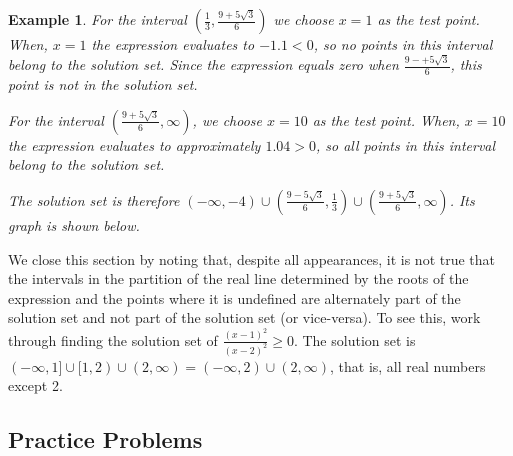 \documentclass[11pt]{book}               %
\newtheorem{example}{Example}
\begin{document}
\begin{example}
For the interval $(\frac{1}{3}, \frac{9 + 5\sqrt{3}}{6})$ we choose $x=1$ as the test point.
When, $x = 1$ the expression evaluates to $-1.1 < 0$, so no points in this interval belong to the solution set.
 Since the expression equals zero when $\frac{9 -+5\sqrt{3}}{6}$, this point is not in the solution set.
 
 For the interval $(\frac{9 + 5\sqrt{3}}{6}, \infty)$, we choose $x = 10$ as the test point.
When, $x = 10$ the expression evaluates to approximately $1.04 > 0$, so all points in this interval belong to the solution set.

The solution set is therefore $(-\infty, -4) \cup (\frac{9 - 5\sqrt{3}}{6}, \frac{1}{3}) \cup (\frac{9 + 5\sqrt{3}}{6}, \infty)$.
Its graph is shown below.

\begin{center}
\end{center}

\end{example}


We close this section by noting that, despite all appearances, it is not true that the intervals in the partition of the real line determined by the roots of the expression and the points where it is undefined are alternately part of the solution set and not part of the solution set (or vice-versa).  To see this, work through finding the solution set of $\frac{(x-1)^2}{(x-2)^2} \geq 0$. The solution set is  
$(-\infty, 1] \cup [1, 2) \cup (2, \infty) = (-\infty, 2) \cup (2, \infty)$, that is, all real numbers except 2.

\subsection{Practice Problems}
\end{document}
